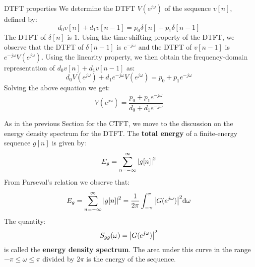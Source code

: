 \documentclass[../../main/main.tex]{subfiles}
\begin{document}
\begin{example}{DTFT properties}{}
    We determine the DTFT \( V(e^{j\omega}) \) of the sequence \( v[n] \), defined by:
    \begin{equation}
        d_{0}v[n] + d_{1}v[n-1]
        =
        p_{0}\delta[n] + p_{1}\delta[n-1]
        \label{eq:L09_S05_1}
    \end{equation}
    The DTFT of \( \delta[n] \) is \( 1 \). Using the time-shifting property of the DTFT, we observe that the DTFT of \( \delta[n-1] \) is \( e^{-j\omega} \) and the DTFT of \( v[n-1] \) is \( e^{-j\omega} V(e^{j\omega}) \).
    Using the linearity property, we then obtain the frequency-domain representation of \( d_{0}v[n] + d_{1}v[n-1] \) as:
    \begin{equation}
        d_{0}V(e^{j\omega}) + d_{1}e^{-j\omega}V(e^{j\omega})
        =
        p_{0} + p_{1}e^{-j\omega}
        \label{eq:L09_S06_2}
    \end{equation}
    Solving the above equation we get:
    \begin{equation}
        V(e^{j\omega})
        =
        \frac{p_{0} + p_{1}e^{-j\omega}}{d_{0} + d_{1}e^{-j\omega}}
        \label{eq:L09_S06_3}
    \end{equation}
\end{example}



\medskip
{}
As in the previous Section for the CTFT, we move to the discussion on the energy density spectrum for the DTFT.
The \textbf{total energy} of a finite-energy sequence \( g[n] \) is given by:
\begin{equation}
    E_{g}
    =
    \sum_{n=-\infty}^{\infty} \abs{g[n]}^2
    \label{eq:L09_S07_1}
\end{equation}
From Parseval's relation we observe that:
\begin{equation}
    E_{g}
    =
    \sum_{n=-\infty}^{\infty} \abs{g[n]}^2
    =
    \frac{1}{2\pi} \int_{-\pi}^{\pi} \abs{G(e^{j\omega})}^2 \mathrm{d}{\omega}
    \label{eq:L09_S07_2}
\end{equation}
The quantity:
\begin{equation}
    S_{gg}(\omega)
    =
    \abs{G(e^{j\omega})}^2
    \label{eq:L09_S08_1}
\end{equation}
is called the \textbf{energy density spectrum}. The area under this curve in the range \( -\pi \le \omega \le \pi \) divided by \( 2\pi \) is the energy of the sequence.
\end{document}
